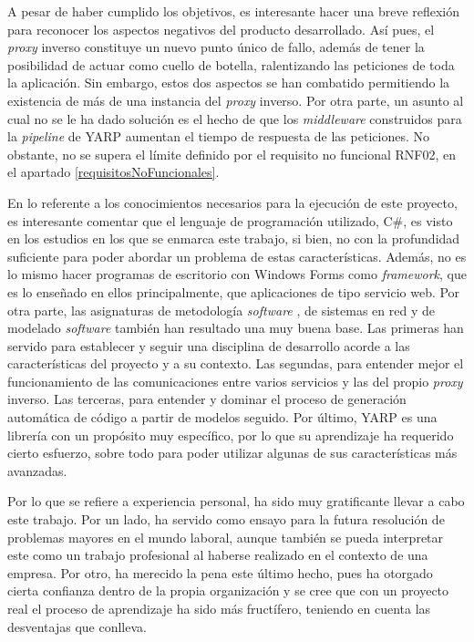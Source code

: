 \documentclass[11pt,spanish,listoffigures]{tfgetsinf}
\begin{document}
A pesar de haber cumplido los objetivos, es interesante hacer una breve reflexión para reconocer los aspectos negativos del producto desarrollado. Así pues, el \emph{proxy} inverso constituye un nuevo punto único de fallo, además de tener la posibilidad de actuar como cuello de botella, ralentizando las peticiones de toda la aplicación. Sin embargo, estos dos aspectos se han combatido permitiendo la existencia de más de una instancia del \emph{proxy} inverso. Por otra parte, un asunto al cual no se le ha dado solución es el hecho de que los \emph{middleware} construidos para la \emph{pipeline} de YARP aumentan el tiempo de respuesta de las peticiones. No obstante, no se supera el límite definido por el requisito no funcional RNF02, en el apartado \ref{requisitosNoFuncionales}.

En lo referente a los conocimientos necesarios para la ejecución de este proyecto, es interesante comentar que el lenguaje de programación utilizado, C\#, es visto en los estudios en los que se enmarca este trabajo, si bien, no con la profundidad suficiente para poder abordar un problema de estas características. Además, no es lo mismo hacer programas de escritorio con Windows Forms \cite{WinForms} como \emph{framework}, que es lo enseñado en ellos principalmente, que aplicaciones de tipo servicio web. Por otra parte, las asignaturas de metodología \emph{software} , de sistemas en red y de modelado \emph{software} también han resultado una muy buena base. Las primeras han servido para establecer y seguir una disciplina de desarrollo acorde a las características del proyecto y a su contexto. Las segundas, para entender mejor el funcionamiento de las comunicaciones entre varios servicios y las del propio \emph{proxy} inverso. Las terceras, para entender y dominar el proceso de generación automática de código a partir de modelos seguido. Por último, YARP es una librería con un propósito muy específico, por lo que su aprendizaje ha requerido cierto esfuerzo, sobre todo para poder utilizar algunas de sus características más avanzadas.

Por lo que se refiere a experiencia personal, ha sido muy gratificante llevar a cabo este trabajo. Por un lado, ha servido como ensayo para la futura resolución de problemas mayores en el mundo laboral, aunque también se pueda interpretar este como un trabajo profesional al haberse realizado en el contexto de una empresa. Por otro, ha merecido la pena este último hecho, pues ha otorgado cierta confianza dentro de la propia organización y se cree que con un proyecto real el proceso de aprendizaje ha sido más fructífero, teniendo en cuenta las desventajas que conlleva.
\end{document}
